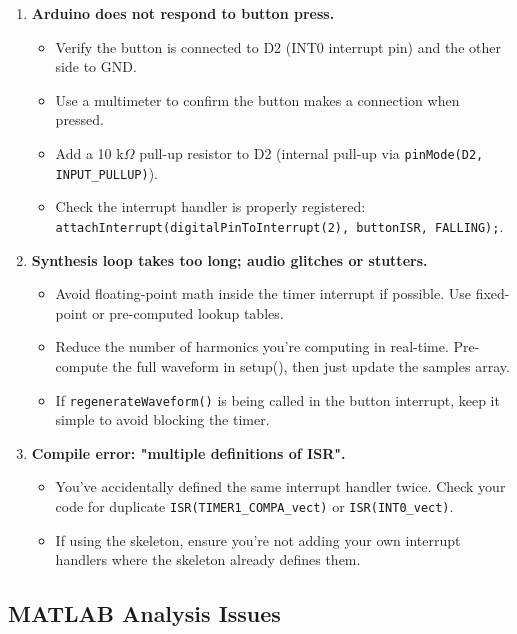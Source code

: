 \documentclass[11pt,letterpaper]{article}
\begin{document}
\begin{enumerate}
    \item \textbf{Arduino does not respond to button press.}
    \begin{itemize}
        \item Verify the button is connected to D2 (INT0 interrupt pin) and the other side to GND.
        \item Use a multimeter to confirm the button makes a connection when pressed.
        \item Add a 10 k$\Omega$ pull-up resistor to D2 (internal pull-up via \texttt{pinMode(D2, INPUT\_PULLUP)}).
        \item Check the interrupt handler is properly registered: \texttt{attachInterrupt(digitalPinToInterrupt(2), buttonISR, FALLING);}.
    \end{itemize}

    \item \textbf{Synthesis loop takes too long; audio glitches or stutters.}
    \begin{itemize}
        \item Avoid floating-point math inside the timer interrupt if possible. Use fixed-point or pre-computed lookup tables.
        \item Reduce the number of harmonics you're computing in real-time. Pre-compute the full waveform in setup(), then just update the samples array.
        \item If \texttt{regenerateWaveform()} is being called in the button interrupt, keep it simple to avoid blocking the timer.
    \end{itemize}

    \item \textbf{Compile error: "multiple definitions of ISR".}
    \begin{itemize}
        \item You've accidentally defined the same interrupt handler twice. Check your code for duplicate \texttt{ISR(TIMER1\_COMPA\_vect)} or \texttt{ISR(INT0\_vect)}.
        \item If using the skeleton, ensure you're not adding your own interrupt handlers where the skeleton already defines them.
    \end{itemize}
\end{enumerate}

\subsection*{MATLAB Analysis Issues}
\end{document}
